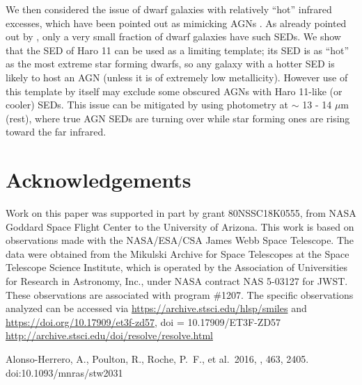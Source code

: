 \documentclass[twocolumn]{aastex63}
\begin{document}
{We then considered the issue of dwarf galaxies with relatively ``hot'' infrared
excesses, which have been pointed out as mimicking AGNs \citep{Hainline2016,
Sturm2025}. As already pointed out by \citet{Hainline2016}, only a very small
fraction of dwarf galaxies have such SEDs. We show that the SED of Haro 11 can
be used as a limiting template; its SED is as ``hot'' as the most extreme star
forming dwarfs, so any galaxy with a hotter SED is likely to host an AGN (unless
it is of extremely low metallicity). However use of this template by itself may exclude some obscured AGNs with Haro 11-like (or cooler) SEDs. This issue can be mitigated by using photometry at $\sim $ 13 - 14
$\mu$m (rest), where true AGN SEDs are turning over while star forming ones are
rising toward the far infrared. 


\section{Acknowledgements}

  Work on this paper was supported in part by grant 80NSSC18K0555, from NASA Goddard Space Flight Center to the University of Arizona. This work is based on observations made with the NASA/ESA/CSA James Webb Space Telescope. The data were obtained from the Mikulski Archive for Space Telescopes at the Space Telescope Science Institute, which is operated by the Association of Universities for Research in Astronomy, Inc., under NASA contract NAS 5-03127 for JWST. These observations are associated with program \#1207. The specific observations analyzed can be accessed via \url{https://archive.stsci.edu/hlsp/smiles} and \url{https://doi.org/10.17909/et3f-zd57}, doi = {10.17909/ET3F-ZD57}
    \url{http://archive.stsci.edu/doi/resolve/resolve.html} 
  
  









\begin{thebibliography}{}

 Alonso-Herrero, A., Poulton, R., Roche, P.~F., et al.\ 2016, \mnras, 463, 2405. doi:10.1093/mnras/stw2031


\end{thebibliography}}
\end{document}
